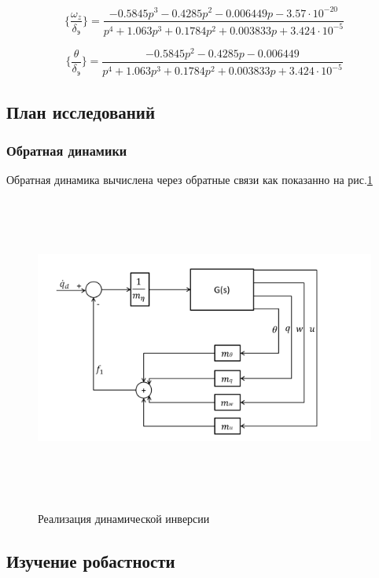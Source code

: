 \begin{equation}
    \label{eq:ПФ по угловой скорости тангажа СПС}
    \{ \frac{\omega_z}{\delta_\text{э}} \} = \frac{-0.5845p^3 - 0.4285p^2 - 0.006449p - 3.57 \cdot 10^{-20}}{p^4 + 1.063p^3 + 0.1784p^2 + 0.003833p + 3.424 \cdot 10^{-5}}
\end{equation}

\begin{equation}
    \label{eq:ПФ по углу наклона траектории}
    \{ \frac{\theta}{\delta_\text{э}} \} = \frac{-0.5845p^2 - 0.4285p - 0.006449}{p^4 + 1.063p^3 + 0.1784p^2 + 0.003833p + 3.424 \cdot 10^{-5}}
\end{equation}

\subsection{План исследований}
\subsubsection{Обратная динамики }
Обратная динамика вычислена через обратные связи как показанно на рис.\ref{fig:САУ_ОД}
\begin{figure}[H]
    \centering \includegraphics[width=15cm,height=10cm]{Оглавление/Part3/figures/САУ_ОД.png}
    \caption{Реализация динамической инверсии}
    {\label{fig:САУ_ОД}}
    \end{figure}
\subsection{Изучение робастности} 

